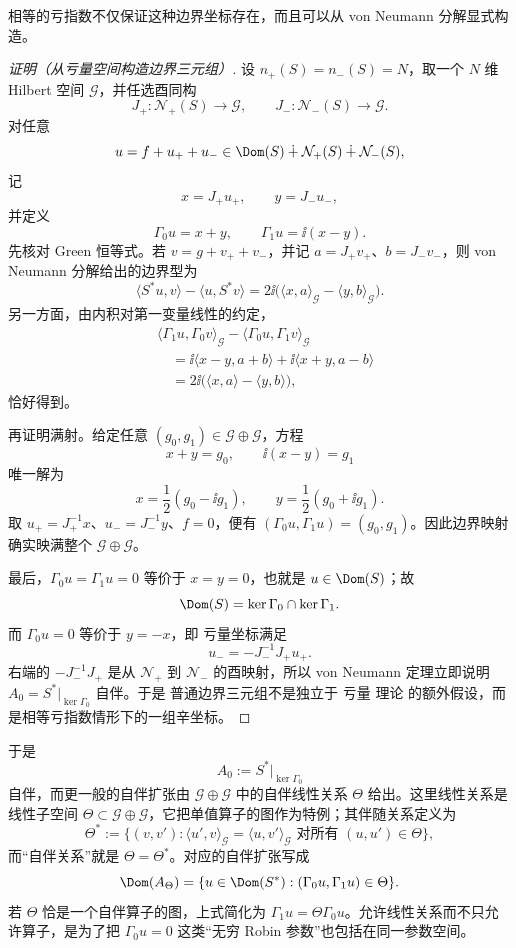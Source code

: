 相等的亏指数不仅保证这种边界坐标存在，而且可以从 von Neumann 分解显式构造。

\begin{proof}[证明（从亏量空间构造边界三元组）]
设 $n_+(S)=n_-(S)=N$，取一个 $N$ 维 Hilbert 空间 $\mathcal G$，并任选酉同构
\[
 J_+:\mathcal N_+(S)\to\mathcal G,
 \qquad
 J_-:\mathcal N_-(S)\to\mathcal G.
\]
对任意
\[
 u=f+u_++u_-
 \in\Dom(S)\mathbin{\dotplus}\mathcal N_+(S)
 \mathbin{\dotplus}\mathcal N_-(S),
\]
记
\[
 x=J_+u_+,
 \qquad
 y=J_-u_-,
\]
并定义
\begin{equation*}\Gamma_0u=x+y,
 \qquad
 \Gamma_1u=\ii(x-y).
\end{equation*}
先核对 Green 恒等式。若
$v=g+v_++v_-$，并记 $a=J_+v_+$、$b=J_-v_-$，则 von Neumann 分解给出的边界型为
\[
 \langle S^*u,v\rangle-\langle u,S^*v\rangle
 =2\ii\bigl(\langle x,a\rangle_{\mathcal G}
 -\langle y,b\rangle_{\mathcal G}\bigr).
\]
另一方面，由内积对第一变量线性的约定，
\begin{align*}
 &\langle\Gamma_1u,\Gamma_0v\rangle_{\mathcal G}
 -\langle\Gamma_0u,\Gamma_1v\rangle_{\mathcal G}\\
 &\quad=\ii\langle x-y,a+b\rangle
 +\ii\langle x+y,a-b\rangle\\
 &\quad=2\ii\bigl(\langle x,a\rangle-\langle y,b\rangle\bigr),
\end{align*}
恰好得到。

再证明满射。给定任意 $(g_0,g_1)\in\mathcal G\oplus\mathcal G$，方程
\[
 x+y=g_0,
 \qquad
 \ii(x-y)=g_1
\]
唯一解为
\[
 x=\frac12(g_0-\ii g_1),
 \qquad
 y=\frac12(g_0+\ii g_1).
\]
取 $u_+=J_+^{-1}x$、$u_-=J_-^{-1}y$、$f=0$，便有
$(\Gamma_0u,\Gamma_1u)=(g_0,g_1)$。因此边界映射确实映满整个 $\mathcal G\oplus\mathcal G$。

最后，$\Gamma_0u=\Gamma_1u=0$ 等价于 $x=y=0$，也就是
$u\in\Dom(S)$；故
\[
 \Dom(S)=\ker\Gamma_0\cap\ker\Gamma_1.
\]
而 $\Gamma_0u=0$ 等价于 $y=-x$，即 亏量坐标满足
\[
 u_-=-J_-^{-1}J_+u_+.
\]
右端的 $-J_-^{-1}J_+$ 是从 $\mathcal N_+$ 到 $\mathcal N_-$ 的酉映射，所以 von Neumann 定理立即说明
$A_0=S^*|_{\ker\Gamma_0}$ 自伴。于是 普通边界三元组不是独立于 亏量 理论 的额外假设，而是相等亏指数情形下的一组辛坐标。
\end{proof}

\begin{proposition}[自伴边界关系与扩张]
于是
\[
 A_0:=S^*|_{\ker\Gamma_0}
\]
自伴，而更一般的自伴扩张由 $\mathcal G\oplus\mathcal G$ 中的自伴线性关系 $\Theta$ 给出。这里线性关系是线性子空间 $\Theta\subset\mathcal G\oplus\mathcal G$，它把单值算子的图作为特例；其伴随关系定义为
\[
 \Theta^*
 :=\{(v,v'):\langle u',v\rangle_{\mathcal G}
 =\langle u,v'\rangle_{\mathcal G}
 \text{ 对所有 }(u,u')\in\Theta\},
\]
而“自伴关系”就是 $\Theta=\Theta^*$。对应的自伴扩张写成
\[
 \Dom(A_\Theta)
 =\{u\in\Dom(S^*):(\Gamma_0u,\Gamma_1u)\in\Theta\}.
\]
若 $\Theta$ 恰是一个自伴算子的图，上式简化为 $\Gamma_1u=\Theta\Gamma_0u$。允许线性关系而不只允许算子，是为了把 $\Gamma_0u=0$ 这类“无穷 Robin 参数”也包括在同一参数空间。
\end{proposition}

